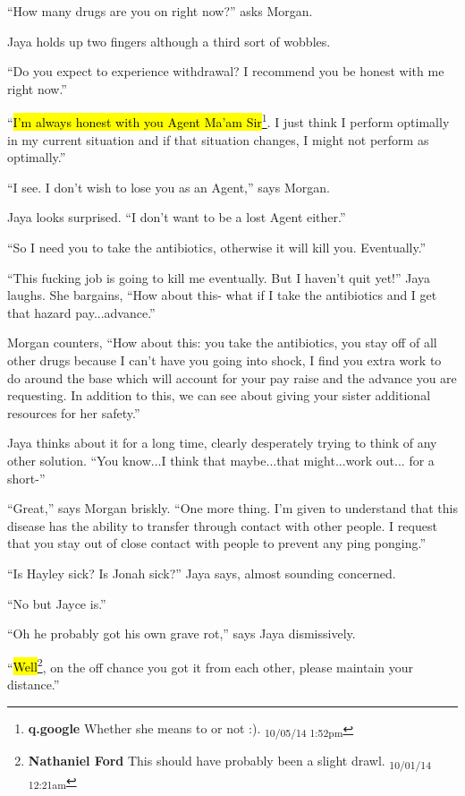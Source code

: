``How many drugs are you on right now?'' asks Morgan.

Jaya holds up two fingers although a third sort of wobbles.

``Do you expect to experience withdrawal?  I recommend you be honest with me right now.''

``\hl{I'm always honest with you Agent Ma'am Sir}\footnote{\textbf{q.google }Whether she means to or not :). \textsubscript{10/05/14 1:52pm}}.  I just think I perform optimally in my current situation and if that situation changes, I might not perform as optimally.''

``I see.  I don't wish to lose you as an Agent,'' says Morgan.

Jaya looks surprised.  ``I don't want to be a lost Agent either.''

``So I need you to take the antibiotics, otherwise it will kill you.  Eventually.''

``This fucking job is going to kill me eventually.  But I haven't quit yet!'' Jaya laughs.  She bargains, ``How about this- what if I take the antibiotics and I get that hazard pay...advance.''

Morgan counters, ``How about this: you take the antibiotics, you stay off of all other drugs because I can't have you going into shock, I find you extra work to do around the base which will account for your pay raise and the advance you are requesting.  In addition to this, we can see about giving your sister additional resources for her safety.''

Jaya thinks about it for a long time, clearly desperately trying to think of any other solution.  ``You know...I think that maybe...that might...work out... for a short-''

``Great,'' says Morgan briskly.  ``One more thing.  I'm given to understand that this disease has the ability to transfer through contact with other people.  I request that you stay out of close contact with people to prevent any ping ponging.''

``Is Hayley sick?  Is Jonah sick?'' Jaya says, almost sounding concerned.

``No but Jayce is.''

``Oh he probably got his own grave rot,'' says Jaya dismissively.

``\hl{Well}\footnote{\textbf{Nathaniel Ford }This should have probably been a slight drawl. \textsubscript{10/01/14 12:21am}}, on the off chance you got it from each other, please maintain your distance.''

